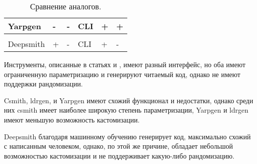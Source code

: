 \begin{table}[ht]
\begin{tabular}{p{5.1em}|m{4em}m{5em}m{4em}m{4em}m{4em}}
    Yarpgen                                                          & -                    & -                       & CLI                 & +                    & +                      \\
    \hline                                                                                                                                                                                  \\
    Deepsmith                                                        & +                    & -                       & CLI                 & +                    & -                      \\
    \hline
\end{tabular}
\caption{
    \label{table-smth}
    Сравнение аналогов.}
\end {table}

Инструменты, описанные в статьях \cite{pg-eli} и \cite{acg-2021}, имеют разный интерфейс, но оба
имеют ограниченную параметризацию и генерируют читаемый код, однако не имеют поддержки рандомизации.

Csmith, ldrgen, и Yarpgen имеют схожий функционал и недостатки, однако среди них csmith имеет наиболее
широкую степень параметризации, Yarpgen и ldrgen имеют меньшую возможность кастомизации.

Deepsmith благодаря машинному обучению генерирует код, максимально схожий с написанным человеком,
однако, по этой же причине, обладает небольшой возможностью кастомизации и не поддерживает какую-либо
рандомизацию.